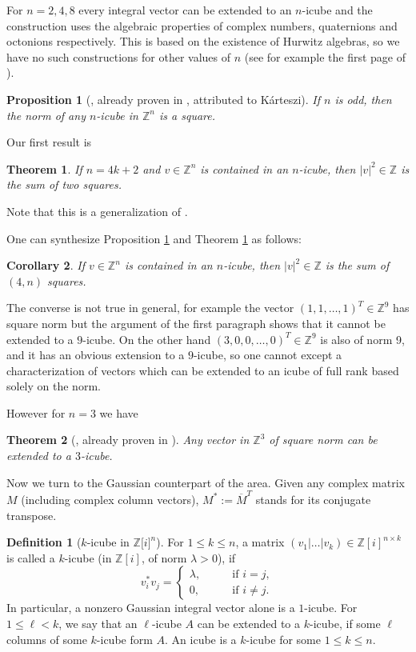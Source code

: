 \documentclass[11pt]{amsart}
\newcommand{\ZZ}{\mathbb{Z}}
\newtheorem{theorem}{Theorem}
\newtheorem{proposition}{Proposition}[section]
\newtheorem{corollary}[proposition]{Corollary}
\theoremstyle{definition}
\newtheorem*{definition}{Definition}
\theoremstyle{remark}
\begin{document}
For $n=2,4,8$ every integral vector can be extended to an  $n$-icube and the construction uses the algebraic properties of complex numbers, quaternions and octonions respectively. This is based on the existence of Hurwitz algebras, so we have no such constructions for other values of $n$ (see for example the first page of \cite{KissKutas}).

\begin{proposition}[{\cite[Proposition~1.3]{GoswickKissMoussongSimanyi}}, already proven in {\cite[p.233]{Sarkozy}}, attributed to Kárteszi]\label{2kp1}
If $n$ is odd, then the norm of any $n$-icube in $\ZZ^n$ is a square.
\end{proposition}

Our first result is
\begin{theorem}\label{4kp2}
If $n=4k+2$ and $v\in\mathbb Z^n$ is contained in an $n$-icube, then $|v|^2\in\mathbb Z$ is the sum of two squares.
\end{theorem}

Note that this is a generalization of \cite[Proposition~18]{LacalleGatti}.

One can synthesize Proposition \ref{2kp1} and Theorem \ref{4kp2} as follows:
\begin{corollary}
If $v\in\mathbb Z^n$ is contained in an $n$-icube, then $|v|^2\in\mathbb Z$ is the sum of $(4,n)$ squares.
\end{corollary}

The converse is not true in general, for example the vector $(1,1, \dots, 1)^T\in\ZZ^9$ has square norm but the argument of the first paragraph shows that it cannot be extended to a $9$-icube. On the other hand $(3,0,0,\dots,0)^T\in\mathbb Z^9$ is also of norm 9, and it has an obvious extension to a $9$-icube, so one cannot except a characterization of vectors which can be extended to an icube of full rank based solely on the norm.

However for $n=3$ we have

\begin{theorem}[{\cite[Theorem~1.4]{GoswickKissMoussongSimanyi}}, already proven in \cite{Sarkozy} ]\label{3Zv}
Any vector in $\ZZ^3$ of square norm can be extended to a $3$-icube.
\end{theorem}

Now we turn to the Gaussian counterpart of the area. Given any complex matrix $M$ (including complex column vectors), $M^*:=\overline{M}^T$ stands for its conjugate transpose.

\begin{definition}[$k$-icube in $\ZZ[{i]}^n$] For $1\leq k\leq n$, a matrix $(v_1|\dotsc|v_k)\in \ZZ[i]^{n\times k}$ is called a $k$-icube (in $\ZZ[i]$, of norm $\lambda > 0$),
if
\[
v_i^* v_j = \begin{cases} \lambda, \qquad & \text{if $i=j$}, \\ 0, & \text{if $i\neq j$.} \end{cases}
\]
In particular, a nonzero Gaussian integral vector alone is a $1$-icube. For $1\leq\ell < k$, we say that an $\ell$-icube $A$ can be extended to a $k$-icube, if some $\ell$ columns of some $k$-icube form $A$. An icube is a $k$-icube for some $1\leq k\leq n$.
\end{definition}
\end{document}
